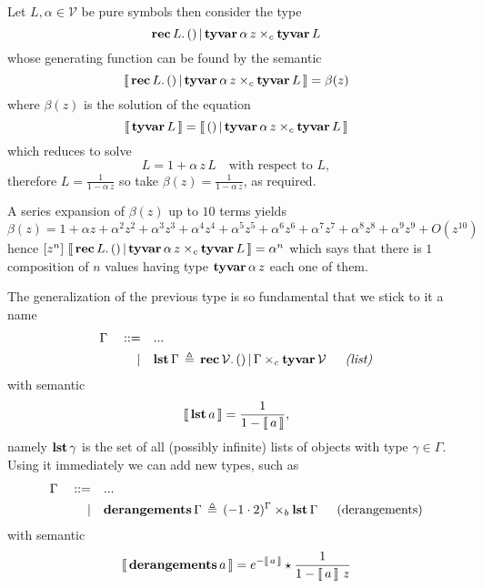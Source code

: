 \begin{example}
Let $L,\alpha\in\mathcal{V}$ be pure symbols then consider the type
\begin{displaymath}
    \textbf{rec}\,L.\,()\,|\,\textbf{tyvar}\,\alpha\,z\times_{c}\textbf{tyvar}\,L
\end{displaymath}
whose generating function can be found by the semantic
\begin{displaymath}
    \left\llbracket\,\textbf{rec}\,L.\,()\,|\,\textbf{tyvar}\,\alpha\,z\times_{c}\textbf{tyvar}\,L\,\right\rrbracket = \beta(z)
\end{displaymath}
where $\beta(z)$ is the solution of the equation 
\begin{displaymath}
    \left\llbracket\,\textbf{tyvar}\,L\,\right\rrbracket = \left\llbracket\,()\,|\,\textbf{tyvar}\,\alpha\,z\times_{c}\textbf{tyvar}\,L\,\right\rrbracket
\end{displaymath}
which reduces to solve
\begin{displaymath}
    L = 1 + \alpha\,z\,L\quad\text{with respect to $L$}, 
\end{displaymath}
therefore $\displaystyle L = \frac{1}{1 - \alpha\,z}$
so take $\displaystyle \beta(z) = \frac{1}{1 - \alpha\,z}$, as required.

A series expansion of $\beta(z)$ up to $10$ terms yields
\begin{displaymath}
\beta(z) = 1 + \alpha z + \alpha^{2} z^{2} + \alpha^{3} z^{3} + \alpha^{4} z^{4} + \alpha^{5} z^{5} + \alpha^{6} z^{6} + \alpha^{7} z^{7} + \alpha^{8} z^{8} + \alpha^{9} z^{9} + O\left(z^{10}\right)
\end{displaymath}
hence $[z^{n}]\,\left\llbracket\,\textbf{rec}\,L.\,()\,|\,\textbf{tyvar}\,\alpha\,z\times_{c}\textbf{tyvar}\,L\,\right\rrbracket =
\alpha^{n}$ which says that there is $1$ composition of $n$ values having type
$\textbf{tyvar}\,\alpha\,z$ each one of them.  
\end{example}

The generalization of the previous type is so fundamental that we stick to it a name
\begin{displaymath}
\begin{split}
    \Gamma\quad::=\quad&... \\
           |\quad&\lst{\Gamma}\,\triangleq\,\rec{\mathcal{V}}{()\,|\,\Gamma\times_{c}\tyvar{\mathcal{V}}}\indent\textit{(list)}
\end{split}
\end{displaymath}
with semantic
\begin{displaymath}
    \left\llbracket\,\textbf{lst}\,a\,\right\rrbracket = \frac{1}{1-\left\llbracket\,a\,\right\rrbracket},
\end{displaymath}
namely $\textbf{lst}\,\gamma$ is the set of all (possibly infinite) lists of
objects with type $\gamma\in\Gamma$. Using it immediately we can add new types, such 
as 
\begin{displaymath}
\begin{split}
    \Gamma\quad::=\quad&... \\
           |\quad&\derangements{\Gamma}\,\triangleq\,(-1\cdot2)^{\Gamma}\times_{b}\lst{\Gamma}\indent\text{(derangements)}
\end{split}
\end{displaymath}
with semantic
\begin{displaymath}
    \left\llbracket\,\textbf{derangements}\,a\,\right\rrbracket = e^{-\left\llbracket\,a\,\right\rrbracket}\star\frac{1}{1-\left\llbracket\,a\,\right\rrbracket\,z}
\end{displaymath}

